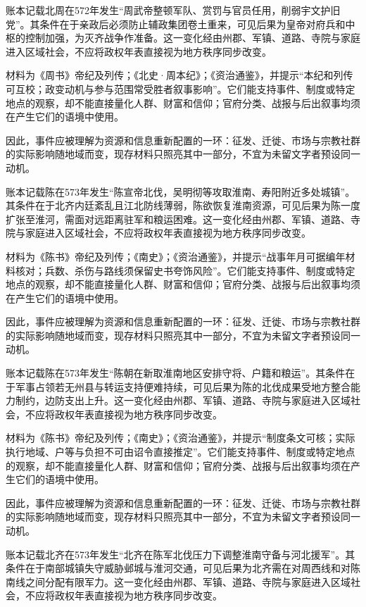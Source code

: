 账本记载北周在572年发生“周武帝整顿军队、赏罚与官员任用，削弱宇文护旧党”。其条件在于亲政后必须防止辅政集团卷土重来，可见后果为皇帝对府兵和中枢的控制加强，为灭齐战争作准备。这一变化经由州郡、军镇、道路、寺院与家庭进入区域社会，不应将政权年表直接视为地方秩序同步改变。

材料为《周书》帝纪及列传；《北史·周本纪》；《资治通鉴》，并提示“本纪和列传可互校；政变动机与参与范围常受胜者叙事影响”。它们能支持事件、制度或特定地点的观察，却不能直接量化人群、财富和信仰；官府分类、战报与后出叙事均须在产生它们的语境中使用。

因此，事件应被理解为资源和信息重新配置的一环：征发、迁徙、市场与宗教社群的实际影响随地域而变，现存材料只照亮其中一部分，不宜为未留文字者预设同一动机。

账本记载陈在573年发生“陈宣帝北伐，吴明彻等攻取淮南、寿阳附近多处城镇”。其条件在于北齐内廷紊乱且江北防线薄弱，陈欲恢复淮南资源，可见后果为陈一度扩张至淮河，需面对远距离驻军和粮运困难。这一变化经由州郡、军镇、道路、寺院与家庭进入区域社会，不应将政权年表直接视为地方秩序同步改变。

材料为《陈书》帝纪及列传；《南史》；《资治通鉴》，并提示“战事年月可据编年材料核对；兵数、杀伤与路线须保留史书夸饰风险”。它们能支持事件、制度或特定地点的观察，却不能直接量化人群、财富和信仰；官府分类、战报与后出叙事均须在产生它们的语境中使用。

因此，事件应被理解为资源和信息重新配置的一环：征发、迁徙、市场与宗教社群的实际影响随地域而变，现存材料只照亮其中一部分，不宜为未留文字者预设同一动机。

账本记载陈在573年发生“陈朝在新取淮南地区安排守将、户籍和粮运”。其条件在于军事占领若无州县与转运支持便难持续，可见后果为陈的北伐成果受地方整合能力制约，边防支出上升。这一变化经由州郡、军镇、道路、寺院与家庭进入区域社会，不应将政权年表直接视为地方秩序同步改变。

材料为《陈书》帝纪及列传；《南史》；《资治通鉴》，并提示“制度条文可核；实际执行地域、户等与负担不可由诏令直接推定”。它们能支持事件、制度或特定地点的观察，却不能直接量化人群、财富和信仰；官府分类、战报与后出叙事均须在产生它们的语境中使用。

因此，事件应被理解为资源和信息重新配置的一环：征发、迁徙、市场与宗教社群的实际影响随地域而变，现存材料只照亮其中一部分，不宜为未留文字者预设同一动机。

账本记载北齐在573年发生“北齐在陈军北伐压力下调整淮南守备与河北援军”。其条件在于南部城镇失守威胁邺城与淮河交通，可见后果为北齐需在对周西线和对陈南线之间分配有限军力。这一变化经由州郡、军镇、道路、寺院与家庭进入区域社会，不应将政权年表直接视为地方秩序同步改变。

